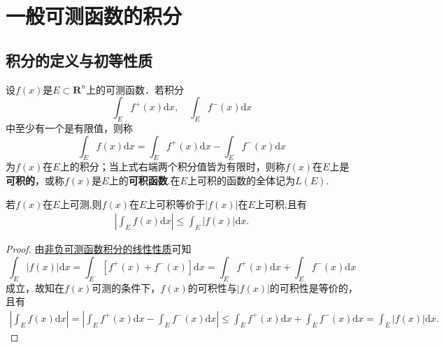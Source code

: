 \documentclass[../../main.tex]{subfiles}
\begin{document}
\section{一般可测函数的积分}

\subsection{积分的定义与初等性质}

\begin{definition}
设\(f(x)\)是\(E \subset \mathbf{R}^n\)上的可测函数．若积分
\[
\int_E f^+(x) \mathrm{d}x, \quad \int_E f^-(x) \mathrm{d}x
\]
中至少有一个是有限值，则称
\[
\int_E f(x) \mathrm{d}x = \int_E f^+(x) \mathrm{d}x - \int_E f^-(x) \mathrm{d}x
\]
为\(f(x)\)在\(E\)上的积分；当上式右端两个积分值皆为有限时，则称\(f(x)\)在\(E\)上是\textbf{可积的}，或称\(f(x)\)是\(E\)上的\textbf{可积函数}.在\(E\)上可积的函数的全体记为\(L(E)\).
\end{definition}

\begin{theorem}\label{theorem:f与|f|的可积性等价}
若\(f(x)\)在$E$上可测,则\(f(x)\)在$E$上可积等价于\(|f(x)|\)在$E$上可积,且有
\begin{align*}
\left| \int_E f(x) \mathrm{d}x \right| \leqslant \int_E |f(x)| \mathrm{d}x. 
\end{align*}
\end{theorem}
\begin{proof}
由\hyperref[theorem:非负可测函数积分的线性性质]{非负可测函数积分的线性性质}可知
\[
\int_E{|f(x)|\mathrm{d}x}=\int_E{\left[ f^+\left( x \right) +f^-\left( x \right) \right] \mathrm{d}x}=\int_E{f^+(x)\mathrm{d}x}+\int_E{f^-(x)\mathrm{d}x}
\]
成立，故知在\(f(x)\)可测的条件下，\(f(x)\)的可积性与\(|f(x)|\)的可积性是等价的，且有
\begin{align*}
\left| \int_E{f(x)\mathrm{d}x} \right|=\left| \int_E{f^+(x)\mathrm{d}x}-\int_E{f^-(x)\mathrm{d}x} \right|\leqslant \int_E{f^+(x)\mathrm{d}x}+\int_E{f^-(x)\mathrm{d}x}=\int_E{|f(x)|\mathrm{d}x}.
\end{align*}
\end{proof}
\end{document}
